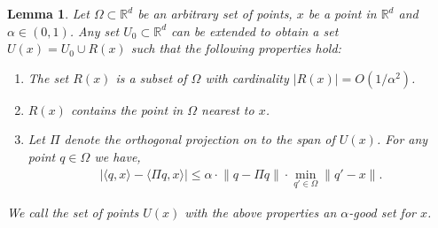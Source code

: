 \documentclass[11pt]{article}
\newtheorem{lemma}{Lemma}[section]
\theoremstyle{restate}
\theoremstyle{definition}
\newcommand{\R}{\ensuremath{\mathbb{R}}}
\newcommand{\norm}[1]{\ensuremath{\|#1\|}}
\begin{document}
\begin{lemma} \label{lem: subspace}
	Let $\Omega \subset \R^d$ be an arbitrary set of points, $x$ be a point in $\R^d$ and $\alpha \in (0,1)$. Any set $U_0 \subset \R^d$ can be extended to obtain a set $U(x) = U_0 \cup R(x)$ such that the following properties hold:
	\begin{enumerate}[]
		\item The set $R(x)$ is a subset of $\Omega$ with cardinality $|R(x)| = O(1/\alpha^2)$.
		\item $R(x)$ contains the point in $\Omega$ nearest to $x$.
		\item Let $\Pi$ denote the orthogonal projection on to the span of $U(x)$.  For any point $q \in \Omega$ we have,
		\begin{align}\label{eq: progress-cond}|\langle q, x \rangle - \langle \Pi q, x \rangle | \leq \alpha  \cdot \norm{q - \Pi q}\cdot \min_{q' \in \Omega} \norm{q' - x}.\end{align}
	\end{enumerate}
    We call the set of points $U(x)$ with the above properties an $\alpha$-good set for $x$.
\end{lemma}
\end{document}
